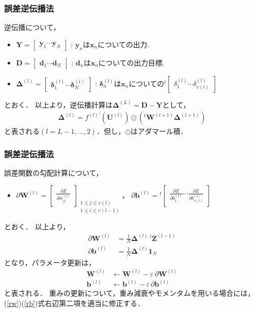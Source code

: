 \documentclass[dvipdfmx]{beamer}
\newcommand{\fp}[2]{\frac{\partial #1}{\partial #2}}
\newcommand{\tp}{{}^t\!}
\renewcommand{\b}[2]{b_{#1}^{(#2)}}
\renewcommand{\d}[2]{\delta_{#1}^{(#2)}}
\newcommand{\w}[2]{w_{#1}^{(#2)}}
\newcommand{\bd}[2]{\bm{\delta}_{#1}^{(#2)}}
\newcommand{\bup}[2]{\bm{#1}^{(#2)}}
\begin{document}
\begin{frame}
    \frametitle{誤差逆伝播法}
    逆伝播について，
    \begin{itemize}
        \item $\bm{Y} = \begin{bmatrix} \bm{y}_1 \cdots \bm{y}_N \end{bmatrix}$
        : $\bm{y}_n$は$\bm{x}_n$についての出力.
        \item $\bm{D} = \begin{bmatrix} \bm{d}_1 \cdots \bm{d}_N \end{bmatrix}$
        : $\bm{d}_n$は$\bm{x}_n$についての出力目標.
        \item $\bup{\Delta}{l} = \begin{bmatrix} \bd{1}{l} \cdots \bd{N}{l} \end{bmatrix}$
        : $\bd{n}{l}$は$\bm{x}_n$についての$\tp \begin{bmatrix}\d{1}{l} \cdots \d{\upsilon(l)}{l}\end{bmatrix}$
    \end{itemize}
    とおく．
    以上より，逆伝播計算は$\bup{\Delta}{L} = \bm{D} - \bm{Y}$として，
    \begin{align}
        \bup{\Delta}{l} = f^{(l)'}(\bup{U}{l}) \odot (\tp\bup{W}{l+1} \bup{\Delta}{l+1})  \label{e4_15}
    \end{align}
    と表される$(l = L-1, \ldots , 2)$．但し，$\odot$はアダマール積．
\end{frame}


\begin{frame}
    \frametitle{誤差逆伝播法}
    誤差関数の勾配計算について，
    \begin{itemize}
        \item $\partial\bup{W}{l} = \begin{bmatrix} \fp{E}{\w{ji}{l}} \end{bmatrix}_{\substack{1 \leq j \leq \upsilon(l) \\ 1 \leq i \leq \upsilon(l-1)}}$，
        $\partial\bup{b}{l} = \tp \begin{bmatrix} \fp{E}{\b{1}{l}} \cdots \fp{E}{\b{\upsilon(l)}{l}} \end{bmatrix}$
    \end{itemize}
    とおく．
    以上より，
    \begin{align*}
        \partial\bup{W}{l} &= \frac{1}{N} \bup{\Delta}{l} \, \tp\bup{Z}{l-1} \\
        \partial\bup{b}{l} &= \frac{1}{N} \bup{\Delta}{l} \bm{1}_N
    \end{align*}
    となり，パラメータ更新は，
    \begin{align}
        \bup{W}{l} &\leftarrow \bup{W}{l} - \varepsilon \, \partial\bup{W}{l}  \label{rw}\\
        \bup{b}{l} &\leftarrow \bup{b}{l} - \varepsilon \, \partial\bup{b}{l}  \label{rb}
    \end{align}
    と表される．
    重みの更新について，重み減衰やモメンタムを用いる場合には，(\ref{rw})(\ref{rb})式右辺第二項を適当に修正する．
\end{frame}
\end{document}
